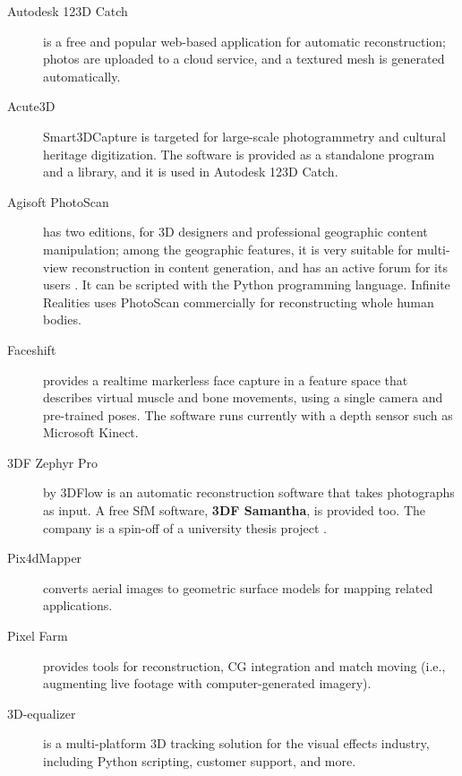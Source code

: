 \begin{description}
	\item[Autodesk 123D Catch] \cite{autodesk123dcatch} is a free and popular web-based application for automatic reconstruction; photos are uploaded to a cloud service, and a textured mesh is generated automatically.

	\item[Acute3D] \cite{acute3d} Smart3DCapture is targeted for large-scale photogrammetry and cultural heritage digitization. The software is provided as a standalone program and a library, and it is used in Autodesk 123D Catch.

	\item[Agisoft PhotoScan] \cite{photoscan}  has two editions, for 3D designers and professional geographic content manipulation; among the geographic features, it is very suitable for multi-view reconstruction in content generation, and has an active forum for its users \cite{agisoftforum}. It can be scripted with the Python programming language. Infinite Realities \cite{ir-ltd} uses PhotoScan commercially for reconstructing whole human bodies.

	\item[Faceshift] \cite{faceshift} provides a realtime markerless face capture in a feature space that describes virtual muscle and bone movements, using a single camera and pre-trained poses. The software runs currently with a depth sensor such as Microsoft Kinect.

	\item[3DF Zephyr Pro] \cite{3dfzephyr} by 3DFlow is an automatic reconstruction software that takes photographs as input. A free SfM software, \textbf{3DF Samantha}, is provided too.
		The company is a spin-off of a university thesis project \cite{toldo2013accurate,toldo2013towards}.

	\item[Pix4dMapper] \cite{pix4d} converts aerial images to geometric surface models for mapping related applications.


	\item[Pixel Farm] \cite{pixelfarm} provides tools for reconstruction, CG integration and match moving (i.e., augmenting live footage with computer-generated imagery).

	\item[3D-equalizer] \cite{3dequalizer} is a multi-platform 3D tracking solution for the visual effects industry, including Python scripting, customer support, and more.
\end{description}

